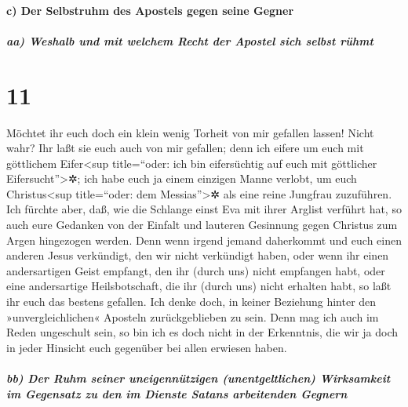 \hypertarget{c-der-selbstruhm-des-apostels-gegen-seine-gegner}{%
\paragraph{c) Der Selbstruhm des Apostels gegen seine
Gegner}\label{c-der-selbstruhm-des-apostels-gegen-seine-gegner}}

\hypertarget{aa-weshalb-und-mit-welchem-recht-der-apostel-sich-selbst-ruxfchmt}{%
\subparagraph{aa) Weshalb und mit welchem Recht der Apostel sich selbst
rühmt}\label{aa-weshalb-und-mit-welchem-recht-der-apostel-sich-selbst-ruxfchmt}}

\hypertarget{section-10}{%
\section{11}\label{section-10}}

 Möchtet ihr euch doch ein klein wenig Torheit von mir
gefallen lassen! Nicht wahr? Ihr laßt sie euch auch von mir gefallen;
 denn ich eifere um euch mit göttlichem Eifer\textless sup
title=``oder: ich bin eifersüchtig auf euch mit göttlicher
Eifersucht''\textgreater✲; ich habe euch ja einem einzigen Manne
verlobt, um euch Christus\textless sup title=``oder: dem
Messias''\textgreater✲ als eine reine Jungfrau zuzuführen.
 Ich fürchte aber, daß, wie die Schlange einst Eva mit
ihrer Arglist verführt hat, so auch eure Gedanken von der Einfalt und
lauteren Gesinnung gegen Christus zum Argen hingezogen werden.
 Denn wenn irgend jemand daherkommt und euch einen anderen
Jesus verkündigt, den wir nicht verkündigt haben, oder wenn ihr einen
andersartigen Geist empfangt, den ihr (durch uns) nicht empfangen habt,
oder eine andersartige Heilsbotschaft, die ihr (durch uns) nicht
erhalten habt, so laßt ihr euch das bestens gefallen.  Ich
denke doch, in keiner Beziehung hinter den »unvergleichlichen« Aposteln
zurückgeblieben zu sein.  Denn mag ich auch im Reden
ungeschult sein, so bin ich es doch nicht in der Erkenntnis, die wir ja
doch in jeder Hinsicht euch gegenüber bei allen erwiesen haben.

\hypertarget{bb-der-ruhm-seiner-uneigennuxfctzigen-unentgeltlichen-wirksamkeit-im-gegensatz-zu-den-im-dienste-satans-arbeitenden-gegnern}{%
\subparagraph{bb) Der Ruhm seiner uneigennützigen (unentgeltlichen)
Wirksamkeit im Gegensatz zu den im Dienste Satans arbeitenden
Gegnern}\label{bb-der-ruhm-seiner-uneigennuxfctzigen-unentgeltlichen-wirksamkeit-im-gegensatz-zu-den-im-dienste-satans-arbeitenden-gegnern}}

